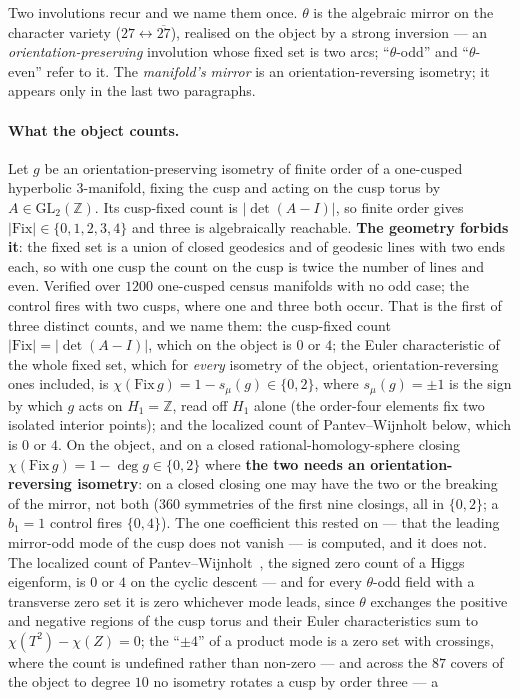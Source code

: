 \documentclass[11pt,a4paper]{article}
\theoremstyle{definition}
\theoremstyle{remark}
\newcommand{\Z}{\mathbb{Z}}
\begin{document}
\noindent Two involutions recur and we name them once. $\theta$ is the algebraic mirror on the character variety
($27 \leftrightarrow \overline{27}$), realised on the object by a strong inversion --- an \emph{orientation-preserving}
involution whose fixed set is two arcs; ``$\theta$-odd'' and ``$\theta$-even'' refer to it. The \emph{manifold's
mirror} is an orientation-reversing isometry; it appears only in the last two paragraphs.

\paragraph{What the object counts.} Let $g$ be an orientation-preserving isometry of finite order of a one-cusped
hyperbolic 3-manifold, fixing the cusp and acting on the cusp torus by $A \in \mathrm{GL}_2(\Z)$. Its cusp-fixed count is $|\det(A - I)|$, so finite
order gives $|\mathrm{Fix}| \in \{0,1,2,3,4\}$ and three is algebraically reachable. \textbf{The geometry forbids
it}: the fixed set is a union of closed geodesics and of geodesic lines with two ends each, so with one cusp the
count on the cusp is twice the number of lines and even. Verified over $1200$ one-cusped census manifolds with
no odd case; the control fires with two cusps, where one and three both occur. That is the first of three
distinct counts, and we name them: the cusp-fixed count $|\mathrm{Fix}| = |\det(A - I)|$, which on the object is $0$ or
$4$; the Euler characteristic of the whole fixed set, which for \emph{every} isometry of the object, orientation-reversing
ones included, is $\chi(\mathrm{Fix}\,g) = 1 - s_\mu(g) \in \{0,2\}$, where $s_\mu(g) = \pm 1$ is the sign by which $g$ acts on $H_1 = \Z$, read off $H_1$ alone (the order-four elements fix
two isolated interior points); and the localized count of Pantev--Wijnholt below, which is $0$ or $4$. On the object, and on a closed
rational-homology-sphere closing $\chi(\mathrm{Fix}\,g) = 1 - \deg g \in \{0, 2\}$ where \textbf{the two needs an
orientation-reversing isometry}: on a closed closing one may have the two or the breaking of the mirror, not
both ($360$ symmetries of the first nine closings, all in $\{0,2\}$; a $b_1 = 1$ control fires $\{0,4\}$). The one
coefficient this rested on --- that the leading mirror-odd mode of the cusp does not vanish --- is computed, and
it does not. The localized count of Pantev--Wijnholt~\cite{pw}, the signed zero count of a Higgs eigenform, is $0$ or $4$ on the cyclic descent --- and for every $\theta$-odd field with a transverse zero set it is zero whichever mode leads, since $\theta$ exchanges the positive and negative regions of the cusp torus and their Euler characteristics sum to $\chi(T^2) - \chi(Z) = 0$; the ``$\pm 4$'' of a product mode is a zero set with crossings, where the count is undefined rather than non-zero --- and across the $87$ covers of the object to degree $10$ no isometry rotates a cusp by order three --- a
\end{document}
